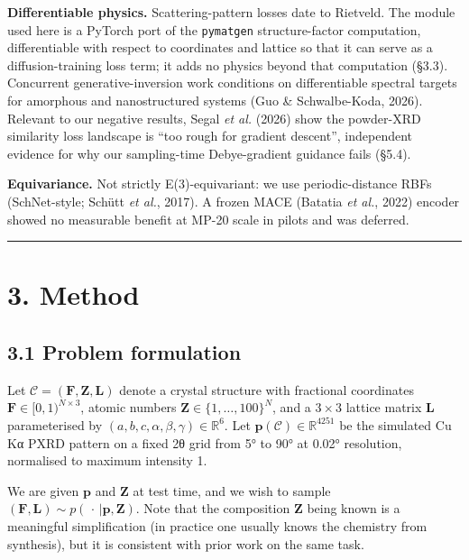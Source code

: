 \documentclass[
  11pt,
]{article}
\begin{document}
\textbf{Differentiable physics.} Scattering-pattern losses date to
Rietveld. The module used here is a PyTorch port of the
\texttt{pymatgen} structure-factor computation, differentiable with
respect to coordinates and lattice so that it can serve as a
diffusion-training loss term; it adds no physics beyond that computation
(§3.3). Concurrent generative-inversion work conditions on
differentiable spectral targets for amorphous and nanostructured systems
(Guo \& Schwalbe-Koda, 2026). Relevant to our negative results, Segal
\emph{et al.} (2026) show the powder-XRD similarity loss landscape is
``too rough for gradient descent'', independent evidence for why our
sampling-time Debye-gradient guidance fails (§5.4).

\textbf{Equivariance.} Not strictly E(3)-equivariant: we use
periodic-distance RBFs (SchNet-style; Schütt \emph{et al.}, 2017). A
frozen MACE (Batatia \emph{et al.}, 2022) encoder showed no measurable
benefit at MP-20 scale in pilots and was deferred.

\begin{center}\rule{0.5\linewidth}{0.5pt}\end{center}

\section{3. Method}\label{method}

\subsection{3.1 Problem formulation}\label{problem-formulation}

Let \(\mathcal{C} = (\mathbf{F}, \mathbf{Z}, \mathbf{L})\) denote a
crystal structure with fractional coordinates
\(\mathbf{F} \in [0,1)^{N \times 3}\), atomic numbers
\(\mathbf{Z} \in \{1,\ldots,100\}^N\), and a \(3 \times 3\) lattice
matrix \(\mathbf{L}\) parameterised by
\((a,b,c,\alpha,\beta,\gamma) \in \mathbb{R}^6\). Let
\(\mathbf{p}(\mathcal{C}) \in \mathbb{R}^{4251}\) be the simulated Cu Kα
PXRD pattern on a fixed 2θ grid from 5° to 90° at 0.02° resolution,
normalised to maximum intensity 1.

We are given \(\mathbf{p}\) and \(\mathbf{Z}\) at test time, and we wish
to sample
\((\mathbf{F}, \mathbf{L}) \sim p(\,\cdot\, | \mathbf{p}, \mathbf{Z})\).
Note that the composition \(\mathbf{Z}\) being known is a meaningful
simplification (in practice one usually knows the chemistry from
synthesis), but it is consistent with prior work on the same task.
\end{document}
